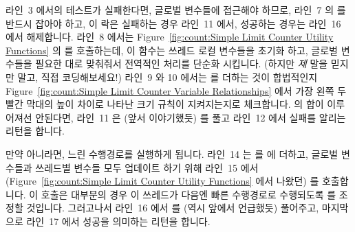 라인~3 에서의 테스트가 실패한다면, 글로벌 변수들에 접근해야 하므로, 라인~7 의
 를 반드시 잡아야 하고, 이 락은 실패하는 경우 라인~11 에서,
성공하는 경우는 라인~16 에서 해제합니다.
라인~8 에서는 Figure~\ref{fig:count:Simple Limit Counter Utility Functions} 의
 를 호출하는데, 이 함수는 쓰레드 로컬 변수들을 초기화
하고, 글로벌 변수들을 필요한 대로 맞춰줘서 전역적인 처리를 단순화 시킵니다.
(하지만 \emph{제} 말을 믿지만 말고, 직접 코딩해보세요!)
라인~9 와 10 에서는  를 더하는 것이 합법적인지
Figure~\ref{fig:count:Simple Limit Counter Variable Relationships} 에서 가장
왼쪽 두 빨간 막대의 높이 차이로 나타난 크기 규칙이 지켜지는지로 체크합니다.
 의 합이 이루어져선 안된다면, 라인~11 은 (앞서 이야기했듯)
 를 풀고 라인~12 에서 실패를 알리는 리턴을 합니다.

만약 아니라면, 느린 수행경로를 실행하게 됩니다.
라인~14 는  를  에 더하고, 글로벌 변수들과 쓰레드별
변수들 모두 업데이트 하기 위해 라인~15 에서 (Figure~\ref{fig:count:Simple Limit
Counter Utility Functions} 에서 나왔던)  를 호출합니다.
이  호출은 대부분의 경우 이 쓰레드가 다음엔 빠른 수행경로로
수행되도록  를 조정할 것입니다.
그러고나서 라인~16 에서  를 (역시 앞에서 언급했듯) 풀어주고,
마지막으로 라인~17 에서 성공을 의미하는 리턴을 합니다.

